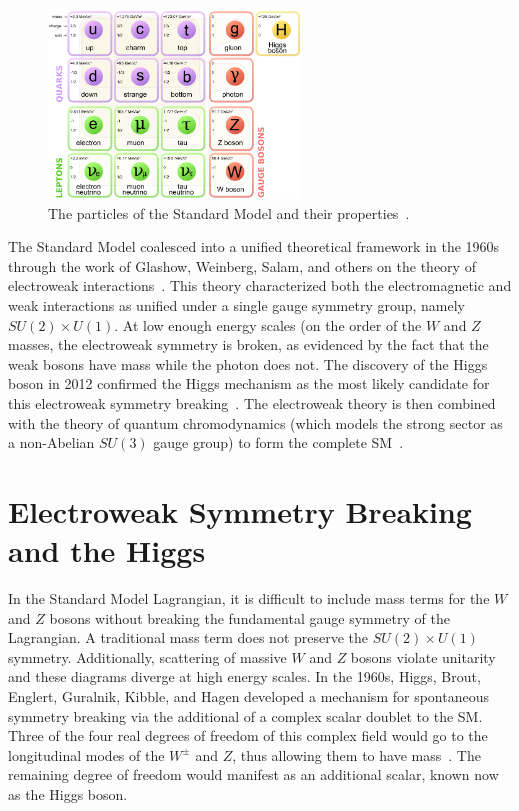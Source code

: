 \begin{figure}[h!]
  \centering
  \captionsetup{justification=centering}

  \includegraphics[width=0.6\textwidth]{figures/SM_particles}
  \caption{The particles of the Standard Model and their properties~\cite{PDG}.}
  \label{fig:sm_particles}
\end{figure}

The Standard Model coalesced into a unified theoretical framework in the 1960s through the work of Glashow, Weinberg, Salam, and others on the theory of electroweak interactions~\cite{Glashow, Weinberg, Salam, Glashow2}. This theory characterized both the electromagnetic and weak interactions as unified under a single gauge symmetry group, namely $SU(2) \times U(1)$. At low enough energy scales (on the order of the $W$ and $Z$ masses, the electroweak symmetry is broken, as evidenced by the fact that the weak bosons have mass while the photon does not. The discovery of the Higgs boson in 2012 confirmed the Higgs mechanism as the most likely candidate for this electroweak symmetry breaking~\cite{Discovery, CMSDiscovery}. The electroweak theory is then combined with the theory of quantum chromodynamics (which models the strong sector as a non-Abelian $SU(3)$ gauge group) to form the complete SM~\cite{QCDBook}. 

\section{Electroweak Symmetry Breaking and the Higgs}

In the Standard Model Lagrangian, it is difficult to include mass terms for the $W$ and $Z$ bosons without breaking the fundamental gauge symmetry of the Lagrangian. A traditional mass term does not preserve the $SU(2) \times U(1)$ symmetry. Additionally, scattering of massive $W$ and $Z$ bosons violate unitarity and these diagrams diverge at high energy scales. In the 1960s, Higgs, Brout, Englert, Guralnik, Kibble, and Hagen developed a mechanism for spontaneous symmetry breaking via the additional of a complex scalar doublet to the SM. Three of the four real degrees of freedom of this complex field would go to the longitudinal modes of the $W^{\pm}$ and $Z$, thus allowing them to have mass~\cite{Higgs1,Higgs2,Englert,Guralnik}. The remaining degree of freedom would manifest as an additional scalar, known now as the Higgs boson. 

